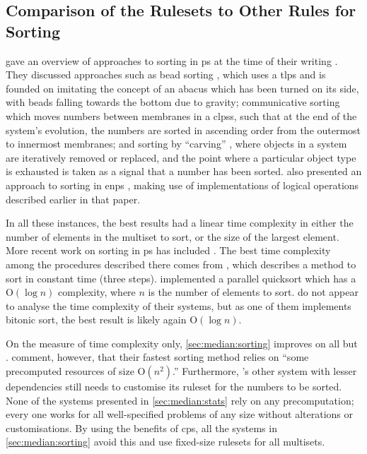 \subsection{Comparison of the  Rulesets to Other  Rules for Sorting}

\citeauthor{Ceterchi2010} gave an overview of approaches to sorting in \gls{ps} at the time of their writing \cite{Ceterchi2010}.  They discussed approaches such as bead sorting \cite{Arulanandham2002}, which uses a \gls{tlps} and is founded on imitating the concept of an abacus which has been turned on its side, with beads falling towards the bottom due to gravity; communicative sorting \cite[Sec. 5.2]{Alhazov2007} which moves numbers between membranes in a \glspl{clps}, such that at the end of the system's evolution, the numbers are sorted in ascending order from the outermost to innermost membranes; and sorting by ``carving'' \cite{Alhazov2007}, where objects in a system are iteratively removed or replaced, and the point where a particular object type is exhausted is taken as a signal that a number has been sorted.  \citeauthor{Maeda2014} also presented an approach to sorting in \gls{enps} \cite{Maeda2014}, making use of implementations of logical operations described earlier in that paper.

In all these instances, the best results had a linear time complexity in either the number of elements in the multiset to sort, or the size of the largest element.  More recent work on sorting in \gls{ps} has included \cite{Gheorghe2017,Metta2015,Yan2019}.  The best time complexity among the procedures described there comes from \cite[Sec. 3.3]{Gheorghe2017}, which describes a method to sort in constant time (three steps).  \citeauthor{Yan2019} \cite{Yan2019} implemented a parallel quicksort which has a O\((\log n)\) complexity, where \(n\) is the number of elements to sort.  \citeauthor{Metta2015} \cite{Metta2015} do not appear to analyse the time complexity of their systems, but as one of them implements bitonic sort, the best result is likely again O\((\log n)\).

On the measure of time complexity only, \cref{sec:median:sorting} improves on all but \cite{Gheorghe2017}.  \citeauthor{Gheorghe2017} comment, however, that their fastest sorting method relies on ``some precomputed resources of size O\((n^2)\).''  Furthermore, \cite{Gheorghe2017}'s other system with lesser dependencies still needs to customise its \gls{ruleset} for the numbers to be sorted.  None of the systems presented in \cref{sec:median:stats} rely on any precomputation; every one works for all well-specified problems of any size without alterations or customisations.  By using the benefits of \gls{cps}, all the systems in \cref{sec:median:sorting} avoid this and use fixed-size \glspl{ruleset} for all multisets.

